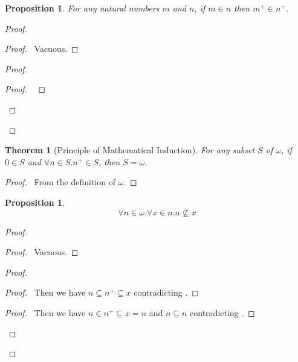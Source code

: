 \documentclass{report}
\let\qed\relax
\newtheorem{prop}[ax]{Proposition}
\newtheorem{thm}[ax]{Theorem}
\theoremstyle{definition}
\begin{document}
\begin{prop}
\label{prop:succ_in_succ}
For any natural numbers $m$ and $n$, if $m \in n$ then $m^+ \in n^+$.
\end{prop}

\begin{proof}
\pf
{}
\begin{proof}
	\pf\ Vacuous.
\end{proof}
\begin{proof}
	\begin{proof}
		\pf\ 
	\end{proof}
\end{proof}
\qed
\end{proof}

\begin{thm}[Principle of Mathematical Induction]
For any subset $S$ of $\omega$, if $0 \in S$ and $\forall n \in S. n^+ \in S$, then $S = \omega$.
\end{thm}

\begin{proof}
\pf\ From the definition of $\omega$. \qed
\end{proof}

\begin{prop}
\label{prop:natural_number_not_subset}
\[ \forall n \in \omega. \forall x \in n. n \not\subseteq x \]
\end{prop}

\begin{proof}
\pf
{}
\begin{proof}
	\pf\ Vacuous.
\end{proof}
\begin{proof}
	\begin{proof}
		\pf\ Then we have $n \subseteq n^+ \subseteq x$ contradicting .
	\end{proof}
	\begin{proof}
		\pf\ Then we have $n \in n^+ \subseteq x = n$ and $n \subseteq n$ contradicting .
	\end{proof}
\end{proof}
\qed
\end{proof}
\end{document}
